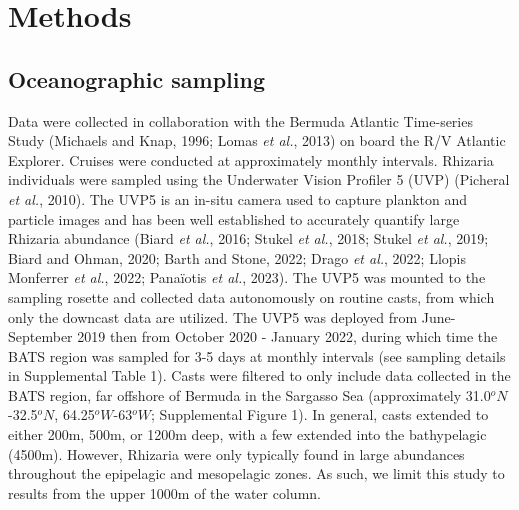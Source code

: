 \documentclass[
]{article}
\begin{document}
\section{Methods}\label{methods}

\subsection{Oceanographic sampling}\label{oceanographic-sampling}

Data were collected in collaboration with the Bermuda Atlantic
Time-series Study (Michaels and Knap, 1996; Lomas \emph{et al.}, 2013)
on board the R/V Atlantic Explorer. Cruises were conducted at
approximately monthly intervals. Rhizaria individuals were sampled using
the Underwater Vision Profiler 5 (UVP) (Picheral \emph{et al.}, 2010).
The UVP5 is an in-situ camera used to capture plankton and particle
images and has been well established to accurately quantify large
Rhizaria abundance (Biard \emph{et al.}, 2016; Stukel \emph{et al.},
2018; Stukel \emph{et al.}, 2019; Biard and Ohman, 2020; Barth and
Stone, 2022; Drago \emph{et al.}, 2022; Llopis Monferrer \emph{et al.},
2022; Panaïotis \emph{et al.}, 2023). The UVP5 was mounted to the
sampling rosette and collected data autonomously on routine casts, from
which only the downcast data are utilized. The UVP5 was deployed from
June-September 2019 then from October 2020 - January 2022, during which
time the BATS region was sampled for 3-5 days at monthly intervals (see
sampling details in Supplemental Table 1). Casts were filtered to only
include data collected in the BATS region, far offshore of Bermuda in
the Sargasso Sea (approximately 31.0\(^oN\)-32.5\(^oN\),
64.25\(^oW\)-63\(^oW\); Supplemental Figure 1). In general, casts
extended to either 200m, 500m, or 1200m deep, with a few extended into
the bathypelagic (4500m). However, Rhizaria were only typically found in
large abundances throughout the epipelagic and mesopelagic zones. As
such, we limit this study to results from the upper 1000m of the water
column.
\end{document}
